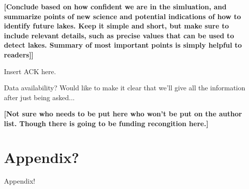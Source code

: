 \documentclass[twocolumn,linenumbers]{aastex631}
\begin{document}
\textbf{\color{red}[Conclude based on how confident we are in the simluation, and summarize points of new science and potential indications of how to identify future lakes. Keep it simple and short, but make sure to include relevant details, such as precise values that can be used to detect lakes. Summary of most important points is simply helpful to readers]]\color{black}}

\begin{acknowledgments}
Insert ACK here. 

\color{blue}Data availability? Would like to make it clear that we'll give all the information after just being asked...\color{black}

\textbf{\color{red}[Not sure who needs to be put here who won't be put on the author list. Though there is going to be funding recongition here.]\color{black}}
\end{acknowledgments}

\appendix

\section{Appendix?}

Appendix!

{}

\end{document}
